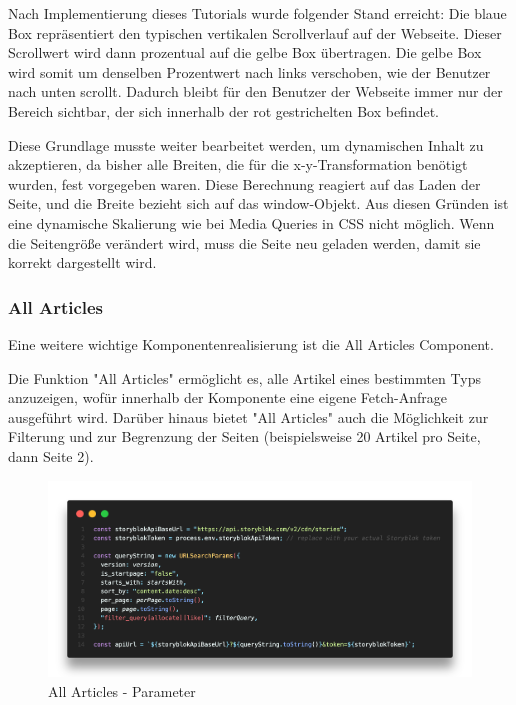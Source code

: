 Nach Implementierung dieses Tutorials wurde folgender Stand erreicht: Die blaue Box repräsentiert den typischen vertikalen Scrollverlauf auf der Webseite. Dieser Scrollwert wird dann prozentual auf die gelbe Box übertragen. Die gelbe Box wird somit um denselben Prozentwert nach links verschoben, wie der Benutzer nach unten scrollt. Dadurch bleibt für den Benutzer der Webseite immer nur der Bereich sichtbar, der sich innerhalb der rot gestrichelten Box befindet.

Diese Grundlage musste weiter bearbeitet werden, um dynamischen Inhalt zu akzeptieren, da bisher alle Breiten, die für die x-y-Transformation benötigt wurden, fest vorgegeben waren. Diese Berechnung reagiert auf das Laden der Seite, und die Breite bezieht sich auf das window-Objekt. Aus diesen Gründen ist eine dynamische Skalierung wie bei Media Queries in CSS nicht möglich. Wenn die Seitengröße verändert wird, muss die Seite neu geladen werden, damit sie korrekt dargestellt wird.

\subsubsection*{All Articles}

Eine weitere wichtige Komponentenrealisierung ist die All Articles Component. 

Die Funktion "All Articles" ermöglicht es, alle Artikel eines bestimmten Typs anzuzeigen, wofür innerhalb der Komponente eine eigene Fetch-Anfrage ausgeführt wird. Darüber hinaus bietet "All Articles" auch die Möglichkeit zur Filterung und zur Begrenzung der Seiten (beispielsweise 20 Artikel pro Seite, dann Seite 2).

\begin{figure}[H]
    \centering
    \includegraphics[width=\linewidth]{pics/allArticles.png}
    \caption{All Articles - Parameter}
    \label{fig:impl:allarticles:url}
\end{figure} 

